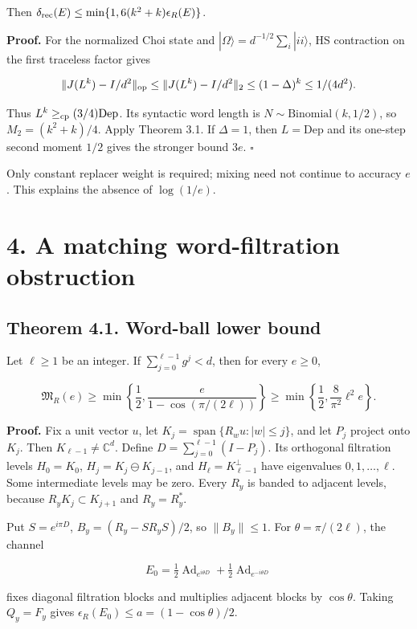\documentclass[11pt]{article}
\begin{document}
Then \(\delta_{\rm rec}(E)\le\min\{1,6(k^2+k)\epsilon_R(E)\}\).

\textbf{Proof.} For the normalized Choi state and
\(|\Omega\rangle=d^{-1/2}\sum_i|ii\rangle\), HS contraction on the first
traceless factor gives

\[
\|J(L^k)-I/d^2\|_{\rm op}\le
\|J(L^k)-I/d^2\|_2\le(1-\Delta)^k\le1/(4d^2).
\]

Thus \(L^k\ge_{\rm cp}(3/4)\mathrm{Dep}\). Its syntactic word length is
\(N\sim\mathrm{Binomial}(k,1/2)\), so \(M_2=(k^2+k)/4\). Apply
Theorem 3.1. If \(\Delta=1\), then \(L=\mathrm{Dep}\) and its one-step
second moment \(1/2\) gives the stronger bound \(3e\). \hfill\(\square\)

Only constant replacer weight is required; mixing need not continue to
accuracy \(e\). This explains the absence of \(\log(1/e)\).

\section*{4. A matching word-filtration obstruction}

\subsection*{Theorem 4.1. Word-ball lower bound}

Let \(\ell\ge1\) be an integer. If
\(\sum_{j=0}^{\ell-1}g^j<d\), then for every \(e\ge0\),

\[
\mathfrak M_R(e)\ge
\min\left\{\frac12,\frac{e}{1-\cos(\pi/(2\ell))}\right\}
\ge\min\left\{\frac12,\frac8{\pi^2}\ell^2e\right\}.
\tag{4.1}
\]

\textbf{Proof.} Fix a unit vector \(u\), let
\(K_j=\operatorname{span}\{R_wu:|w|\le j\}\), and let \(P_j\) project
onto \(K_j\). Then \(K_{\ell-1}\ne\mathbb C^d\). Define
\(D=\sum_{j=0}^{\ell-1}(I-P_j)\). Its orthogonal filtration levels
\(H_0=K_0\), \(H_j=K_j\ominus K_{j-1}\), and
\(H_\ell=K_{\ell-1}^\perp\) have eigenvalues \(0,1,\ldots,\ell\).
Some intermediate levels may be zero. Every \(R_y\) is banded to adjacent
levels, because \(R_yK_j\subset K_{j+1}\) and \(R_y=R_y^*\).

Put \(S=e^{i\pi D}\), \(B_y=(R_y-SR_yS)/2\), so \(\|B_y\|\le1\).
For \(\theta=\pi/(2\ell)\), the channel

\[
E_0=\tfrac12\operatorname{Ad}_{e^{i\theta D}}+
\tfrac12\operatorname{Ad}_{e^{-i\theta D}}
\]

fixes diagonal filtration blocks and multiplies adjacent blocks by
\(\cos\theta\). Taking \(Q_y=F_y\) gives
\(\epsilon_R(E_0)\le a=(1-\cos\theta)/2\).
\end{document}
